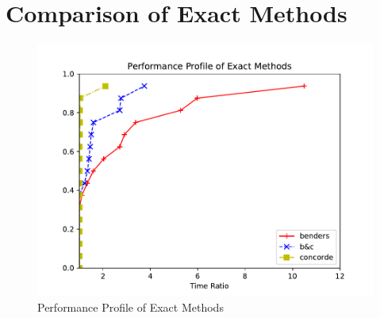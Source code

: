 \section{Comparison of Exact Methods}

\begin{figure}[!h]
    \centering
    \includegraphics[width=\textwidth]{images/exact.pdf}
    \caption{Performance Profile of Exact Methods}
    \label{fig:exact}
\end{figure}
